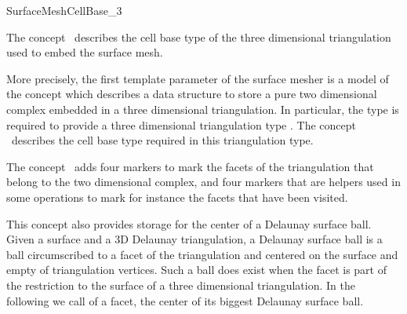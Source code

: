 

\begin{ccRefConcept}{SurfaceMeshCellBase_3}


\ccDefinition
The concept \ccRefName\ describes the cell base type
of the three dimensional triangulation used
to embed the surface mesh.  

More precisely,
the first template parameter  of the surface mesher
is a model of the concept 
which describes a data structure to store
a pure two dimensional complex 
embedded in a three dimensional triangulation.
In particular, the type  is required to provide
a three dimensional triangulation type
. 
The concept \ccRefName\ describes the cell base type
required in this triangulation type.

\ccRefines
{}

The concept \ccRefName\ adds four markers to mark the facets
of the triangulation that belong to the two dimensional complex,
and four markers  that are helpers 
used in some operations to mark for instance
the facets that have been visited.

This concept also provides storage for  the center of a Delaunay surface
ball. 
Given a surface and a 3D  Delaunay triangulation,
 a Delaunay surface ball
is a ball circumscribed to a facet of the triangulation
and centered on the surface and empty of triangulation vertices. 
Such a ball does exist
when the facet is part of the restriction to the surface
of a three dimensional triangulation.
 In the following we call 
of a facet, the center of its biggest Delaunay surface ball.

\ccTypes



\end{ccRefConcept}
